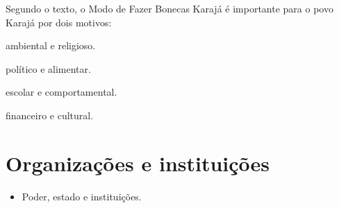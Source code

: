 Segundo o texto, o Modo de Fazer Bonecas Karajá é importante para o povo
Karajá por dois motivos:

\begin{minipage}{.5\textwidth}
\begin{escolha}
\item ambiental e religioso.

\item político e alimentar.

\item escolar e comportamental.

\item financeiro e cultural.
\end{escolha}
\end{minipage}

\chapter{Organizações e instituições}



\begin{itemize}
\item Poder, estado e instituições.
\end{itemize}


